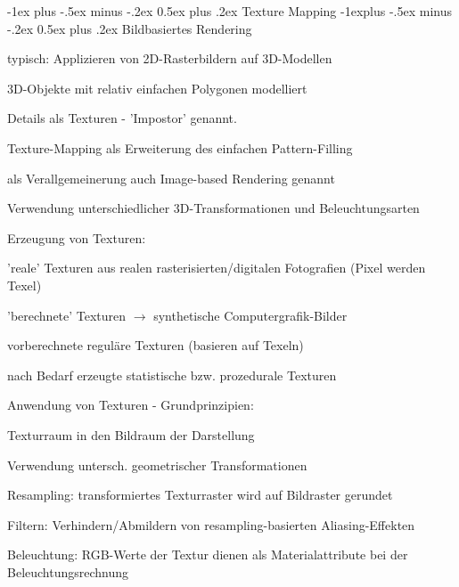 \documentclass[landscape]{article}
\makeatletter
\renewcommand{\section}{\@startsection{section}{1}{0mm}%
                                {-1ex plus -.5ex minus -.2ex}%
                                {0.5ex plus .2ex}%
                                {\normalfont\large\bfseries}}
\renewcommand{\subsection}{\@startsection{subsection}{2}{0mm}%
                                {-1explus -.5ex minus -.2ex}%
                                {0.5ex plus .2ex}%
                                {\normalfont\normalsize\bfseries}}
\makeatother
\begin{document}
\begin{multicols}{3}
  \section{Texture Mapping}
  \subsection{Bildbasiertes Rendering}
  \begin{itemize*}
    \item typisch: Applizieren von 2D-Rasterbildern auf 3D-Modellen
    \item 3D-Objekte mit relativ einfachen Polygonen modelliert
    \item Details als Texturen - 'Impostor' genannt.
    \item Texture-Mapping als Erweiterung des einfachen Pattern-Filling
    \item als Verallgemeinerung auch Image-based Rendering genannt
    \item Verwendung unterschiedlicher 3D-Transformationen und Beleuchtungsarten
  \end{itemize*}
  
  Erzeugung von Texturen:
  \begin{itemize*}
    \item 'reale' Texturen aus realen rasterisierten/digitalen Fotografien (Pixel werden Texel)
    \item 'berechnete' Texturen $\rightarrow$ synthetische Computergrafik-Bilder
    \item vorberechnete reguläre Texturen (basieren auf Texeln) 
    \item nach Bedarf erzeugte statistische bzw. prozedurale Texturen
  \end{itemize*}
  
  Anwendung von Texturen - Grundprinzipien:
  \begin{itemize*}
    \item Texturraum in den Bildraum der Darstellung
    \item Verwendung untersch. geometrischer Transformationen
    \item Resampling: transformiertes Texturraster wird auf Bildraster gerundet
    \item Filtern: Verhindern/Abmildern von resampling-basierten Aliasing-Effekten
    \item Beleuchtung: RGB-Werte der Textur dienen als Materialattribute bei der Beleuchtungsrechnung
  \end{itemize*}
  

\end{multicols}
\end{document}
